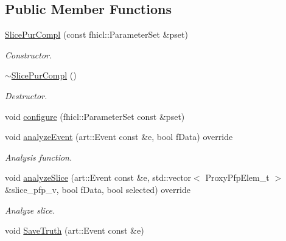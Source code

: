 \subsection*{Public Member Functions}
\begin{DoxyCompactItemize}
\item 
\hyperlink{classanalysis_1_1SlicePurCompl_a8d0b7176feea1c0cda563f1a528a4643}{Slice\+Pur\+Compl} (const fhicl\+::\+Parameter\+Set \&pset)
\begin{DoxyCompactList}\small\item\em Constructor. \end{DoxyCompactList}\item 
\hyperlink{classanalysis_1_1SlicePurCompl_aba1c519efb59ad152d186ab4a1a2c6ca}{$\sim$\+Slice\+Pur\+Compl} ()\hypertarget{classanalysis_1_1SlicePurCompl_aba1c519efb59ad152d186ab4a1a2c6ca}{}\label{classanalysis_1_1SlicePurCompl_aba1c519efb59ad152d186ab4a1a2c6ca}

\begin{DoxyCompactList}\small\item\em Destructor. \end{DoxyCompactList}\item 
void \hyperlink{classanalysis_1_1SlicePurCompl_a902e57f96d7a335793856af6c7f7580f}{configure} (fhicl\+::\+Parameter\+Set const \&pset)
\item 
void \hyperlink{classanalysis_1_1SlicePurCompl_af71528c37c501d30f5bbc1e75b50b3f6}{analyze\+Event} (art\+::\+Event const \&e, bool f\+Data) override
\begin{DoxyCompactList}\small\item\em Analysis function. \end{DoxyCompactList}\item 
void \hyperlink{classanalysis_1_1SlicePurCompl_ab13316464f9ed61e81b18d59ca38d9a1}{analyze\+Slice} (art\+::\+Event const \&e, std\+::vector$<$ Proxy\+Pfp\+Elem\+\_\+t $>$ \&slice\+\_\+pfp\+\_\+v, bool f\+Data, bool selected) override\hypertarget{classanalysis_1_1SlicePurCompl_ab13316464f9ed61e81b18d59ca38d9a1}{}\label{classanalysis_1_1SlicePurCompl_ab13316464f9ed61e81b18d59ca38d9a1}

\begin{DoxyCompactList}\small\item\em Analyze slice. \end{DoxyCompactList}\item 
void \hyperlink{classanalysis_1_1SlicePurCompl_a39079f2f29d253440c7ebd2deeaccfef}{Save\+Truth} (art\+::\+Event const \&e)\hypertarget{classanalysis_1_1SlicePurCompl_a39079f2f29d253440c7ebd2deeaccfef}{}\label{classanalysis_1_1SlicePurCompl_a39079f2f29d253440c7ebd2deeaccfef}


\end{DoxyCompactItemize}
